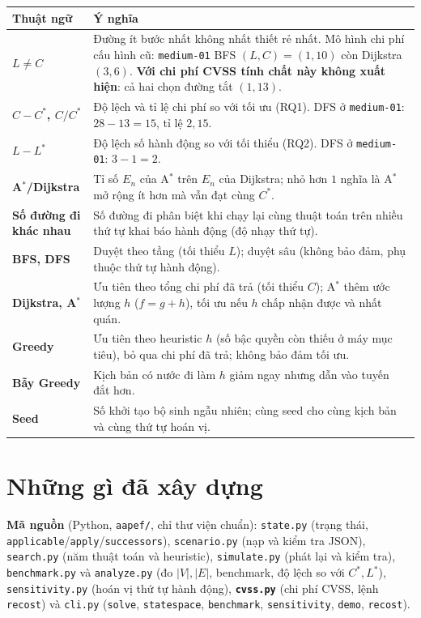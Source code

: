 \documentclass[11pt,a4paper]{article}
\newcommand{\Cs}{C^{*}}
\newcommand{\Ls}{L^{*}}
\newcommand{\V}{|V|}
\newcommand{\E}{|E|}
\newcommand{\En}{E_{n}}
\begin{document}
\begin{longtable}{@{}Y{3.4cm}Y{12.4cm}@{}}
\toprule
Thuật ngữ & Ý nghĩa \\
\midrule
\endhead
\textbf{$L\neq C$} & Đường ít bước nhất không nhất thiết rẻ nhất. Mô hình chi phí cấu hình cũ: \texttt{medium-01} BFS $(L,C)=(1,10)$ còn Dijkstra $(3,6)$. \textbf{Với chi phí CVSS tính chất này không xuất hiện}: cả hai chọn đường tắt $(1,13)$. \\
\textbf{$C-\Cs$, $C/\Cs$} & Độ lệch và tỉ lệ chi phí so với tối ưu (RQ1). DFS ở \texttt{medium-01}: $28-13=15$, tỉ lệ $2{,}15$. \\
\textbf{$L-\Ls$} & Độ lệch số hành động so với tối thiểu (RQ2). DFS ở \texttt{medium-01}: $3-1=2$. \\
\textbf{A$^{*}$/Dijkstra} & Tỉ số $\En$ của A$^{*}$ trên $\En$ của Dijkstra; nhỏ hơn $1$ nghĩa là A$^{*}$ mở rộng ít hơn mà vẫn đạt cùng $\Cs$. \\
\textbf{Số đường đi khác nhau} & Số đường đi phân biệt khi chạy lại cùng thuật toán trên nhiều thứ tự khai báo hành động (độ nhạy thứ tự). \\
\textbf{BFS, DFS} & Duyệt theo tầng (tối thiểu $L$); duyệt sâu (không bảo đảm, phụ thuộc thứ tự hành động). \\
\textbf{Dijkstra, A$^{*}$} & Ưu tiên theo tổng chi phí đã trả (tối thiểu $C$); A$^{*}$ thêm ước lượng $h$ ($f=g+h$), tối ưu nếu $h$ chấp nhận được và nhất quán. \\
\textbf{Greedy} & Ưu tiên theo heuristic $h$ (số bậc quyền còn thiếu ở máy mục tiêu), bỏ qua chi phí đã trả; không bảo đảm tối ưu. \\
\textbf{Bẫy Greedy} & Kịch bản có nước đi làm $h$ giảm ngay nhưng dẫn vào tuyến đắt hơn. \\
\textbf{Seed} & Số khởi tạo bộ sinh ngẫu nhiên; cùng seed cho cùng kịch bản và cùng thứ tự hoán vị. \\
\bottomrule
\end{longtable}

\section{Những gì đã xây dựng}

\textbf{Mã nguồn} (Python, \texttt{aapef/}, chỉ thư viện chuẩn): \texttt{state.py} (trạng thái, \texttt{applicable}/\texttt{apply}/\texttt{successors}), \texttt{scenario.py} (nạp và kiểm tra JSON), \texttt{search.py} (năm thuật toán và heuristic), \texttt{simulate.py} (phát lại và kiểm tra), \texttt{benchmark.py} và \texttt{analyze.py} (đo $\V,\E$, benchmark, độ lệch so với $\Cs,\Ls$), \texttt{sensitivity.py} (hoán vị thứ tự hành động), \textbf{\texttt{cvss.py}} (chi phí CVSS, lệnh \texttt{recost}) và \texttt{cli.py} (\texttt{solve}, \texttt{statespace}, \texttt{benchmark}, \texttt{sensitivity}, \texttt{demo}, \texttt{recost}).
\end{document}
